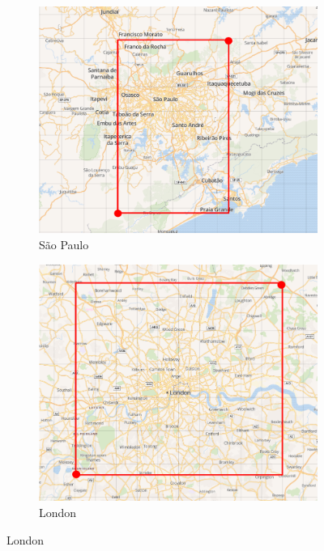 \begin{figure}[h]
    \centering
    \begin{subfigure}[t]{0.31\textwidth}
        \centering
        \includegraphics[width=1\linewidth]{figures/sp_bb.png}
        \caption{São Paulo}
        \label{fig:saopaulo_bounding_box}
    \end{subfigure}%
    \quad
    \begin{subfigure}[t]{0.3\textwidth}
        \centering
        \includegraphics[width=1\linewidth]{figures/london_bb.png}
        \caption{London}

\end{subfigure}
\end{figure}
